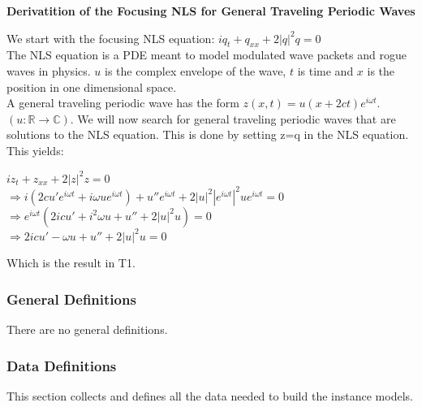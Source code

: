 \documentclass[12pt]{article}
\begin{document}
\begin{center}
\newpage
\begin{flushleft}
	\textbf{Derivatition of the Focusing NLS for 
		General Traveling Periodic 
		Waves}
\end{flushleft} 

\end{center} 

We start with the focusing NLS equation: $iq_{t} + q_{xx} + 
2|q|^{2}q=0$ \\ 

The NLS equation is a PDE meant to model modulated wave packets and rogue waves 
in physics. $u$ is the complex envelope of the wave, $t$ is time and $x$ is the 
position in one dimensional space. \\ 

A general traveling periodic wave has the form $z(x,t)=u(x+2ct)e^{i \omega 
t}$.$(u: \mathbb{R} \rightarrow \mathbb{C})$. 
We will now search for general traveling periodic waves that are solutions to 
the NLS equation. This is done by setting z=q in the NLS equation. This 
yields: \\ 
\begin{center}
$ iz_{t} + z_{xx} + 2|z|^{2}z = 0$ \\ 
$ \Rightarrow i(2cu'e^{i \omega t} + i \omega ue^{i \omega t}) + u''e^{i \omega 
t} + 2|u|^{2}|e^{i \omega t}|^{2} u e^{i \omega t} = 0 $ \\
 $\Rightarrow e^{i \omega t} (2icu' + i^{2} \omega u + u'' + 2|u|^{2}u) = 0 $ 
 \\ 
$ \Rightarrow 2icu' - \omega u + u'' + 2|u|^{2}u =0$ \\ 
\end{center}
Which is the result in T1.

\subsubsection{General Definitions}\label{sec_gendef}

There are no general definitions.

\subsubsection{Data Definitions}\label{sec_datadef}

This section collects and defines all the data needed to build the instance
models. 
~\newline
\end{document}
